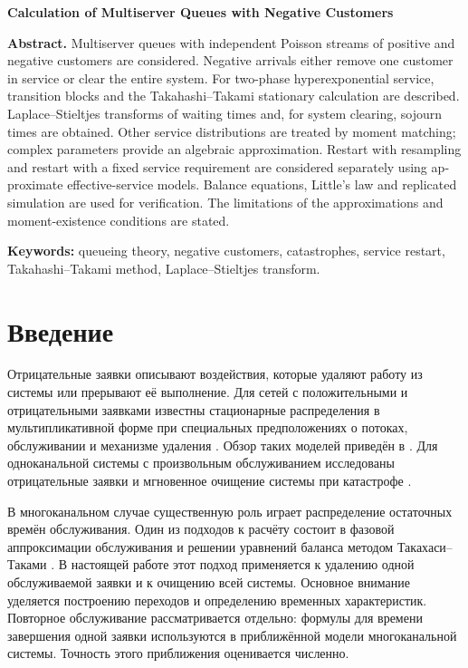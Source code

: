 \documentclass[a4paper,12pt]{article}
\begin{document}
\begin{otherlanguage}{english}
\bigskip
\begin{center}\textbf{Calculation of Multiserver Queues with Negative Customers}\end{center}
\textbf{Abstract.} Multiserver queues with independent Poisson streams of positive and negative customers are considered. Negative arrivals either remove one customer in service or clear the entire system. For two-phase hyperexponential service, transition blocks and the Takahashi--Takami stationary calculation are described. Laplace--Stieltjes transforms of waiting times and, for system clearing, sojourn times are obtained. Other service distributions are treated by moment matching; complex parameters provide an algebraic approximation. Restart with resampling and restart with a fixed service requirement are considered separately using approximate effective-service models. Balance equations, Little's law and replicated simulation are used for verification. The limitations of the approximations and moment-existence conditions are stated.

\textbf{Keywords:} queueing theory, negative customers, catastrophes, service restart, Takahashi--Takami method, Laplace--Stieltjes transform.
\end{otherlanguage}


\section{Введение}
Отрицательные заявки описывают воздействия, которые удаляют работу из системы или прерывают её выполнение. Для сетей с положительными и отрицательными заявками известны стационарные распределения в мультипликативной форме при специальных предположениях о потоках, обслуживании и механизме удаления \cite{gelenbe1991,gelenbe1992}. Обзор таких моделей приведён в \cite{artalejo2000}. Для одноканальной системы с произвольным обслуживанием исследованы отрицательные заявки \cite{harrison1996} и мгновенное очищение системы при катастрофе \cite{jain1996}.

В многоканальном случае существенную роль играет распределение остаточных времён обслуживания. Один из подходов к расчёту состоит в фазовой аппроксимации обслуживания и решении уравнений баланса методом Такахаси--Таками \cite{takahashi1976,ryzhikov2018ru}. В настоящей работе этот подход применяется к удалению одной обслуживаемой заявки и к очищению всей системы. Основное внимание уделяется построению переходов и определению временных характеристик. Повторное обслуживание рассматривается отдельно: формулы для времени завершения одной заявки используются в приближённой модели многоканальной системы. Точность этого приближения оценивается численно.
\end{document}
